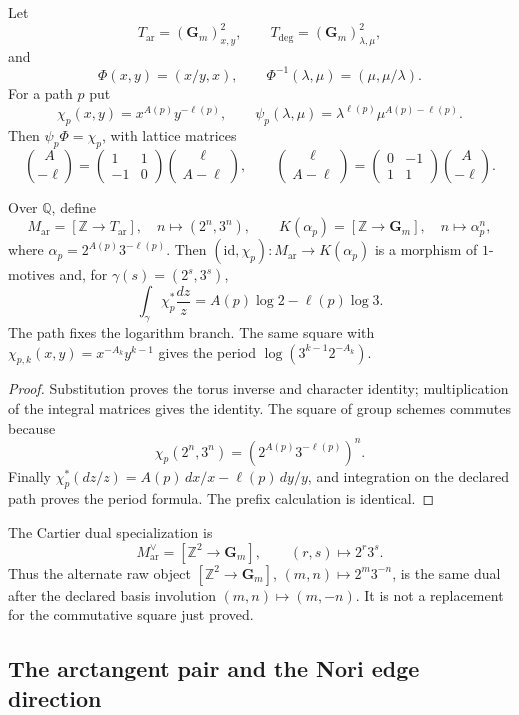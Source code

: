 \begin{theorem}
\label{thm:critical-torus-kummer-repair}
Let
\[
 T_{\mathrm{ar}}=(\mathbf G_m)^2_{x,y},\qquad
 T_{\deg}=(\mathbf G_m)^2_{\lambda,\mu},
\]
and
\[
 \Phi(x,y)=(x/y,x),\qquad
 \Phi^{-1}(\lambda,\mu)=(\mu,\mu/\lambda).
\]
For a path $p$ put
\[
 \chi_p(x,y)=x^{A(p)}y^{-\ell(p)},\qquad
 \psi_p(\lambda,\mu)=\lambda^{\ell(p)}\mu^{A(p)-\ell(p)}.
\]
Then $\psi_p\Phi=\chi_p$, with lattice matrices
\[
 \binom{A}{-\ell}
 =\begin{pmatrix}1&1\\ -1&0\end{pmatrix}
 \binom{\ell}{A-\ell},
 \qquad
 \binom{\ell}{A-\ell}
 =\begin{pmatrix}0&-1\\ 1&1\end{pmatrix}
 \binom{A}{-\ell}.
\]

Over $\mathbb Q$, define
\[
 M_{\mathrm{ar}}=[\mathbb Z\to T_{\mathrm{ar}}],
 \quad n\mapsto(2^n,3^n),
 \qquad
 K(\alpha_p)=[\mathbb Z\to\mathbf G_m],
 \quad n\mapsto\alpha_p^n,
\]
where $\alpha_p=2^{A(p)}3^{-\ell(p)}$.  Then
$(\mathrm{id},\chi_p):M_{\mathrm{ar}}\to K(\alpha_p)$ is a morphism of
$1$-motives and, for $\gamma(s)=(2^s,3^s)$,
\[
 \int_\gamma\chi_p^*\frac{dz}{z}
 =A(p)\log2-\ell(p)\log3.
\]
The path fixes the logarithm branch.  The same square with
$\chi_{p,k}(x,y)=x^{-A_k}y^{k-1}$ gives the period
$\log(3^{k-1}2^{-A_k})$.
\end{theorem}

\begin{proof}
Substitution proves the torus inverse and character identity; multiplication
of the integral matrices gives the identity.  The square of group schemes
commutes because
\[
 \chi_p(2^n,3^n)=(2^{A(p)}3^{-\ell(p)})^n.
\]
Finally
$\chi_p^*(dz/z)=A(p)\,dx/x-\ell(p)\,dy/y$, and integration on the declared
path proves the period formula.  The prefix calculation is identical.
\end{proof}

The Cartier dual specialization is
\[
 M_{\mathrm{ar}}^\vee=[\mathbb Z^2\to\mathbf G_m],\qquad
 (r,s)\mapsto2^r3^s.
\]
Thus the alternate raw object
$[\mathbb Z^2\to\mathbf G_m]$, $(m,n)\mapsto2^m3^{-n}$, is the same dual
after the declared basis involution $(m,n)\mapsto(m,-n)$.  It is not a
replacement for the commutative square just proved.

\subsection{The arctangent pair and the Nori edge direction}

